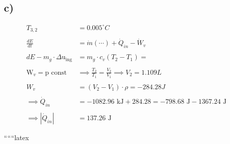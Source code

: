 

\subsection*{c)}

\begin{align*}
T_{3,2} &= 0.005^\circ C \\
& \\
\frac{dE}{dt} & = \dot{m} (\cdots) + \dot{Q}_{in} - \dot{W}_v \\
& \\
dE - m_g \cdot \Delta \text{u}_{\text{ing}} & = m_g \cdot c_v (T_2 - T_1) = \\
& \\
\text{W}_v = \text{p const} & \implies \frac{T_2}{T_1} = \frac{V_2}{V_1} \implies V_2 = 1.109 L \\
& \\
W_v & = (V_2 - V_1) \cdot \rho = -284.28 J \\
& \\
\implies \dot{Q}_{in} & = -1082.96 \text{ kJ} + 284.28 = -798.68 \text{ J} - 1367.24 \text{ J} \\
& \\
\implies |\dot{Q}_{in}| & = 137.26 \text{ J}
\end{align*}

``````latex